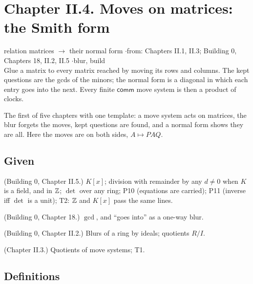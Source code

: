 \section*{Chapter II.4. Moves on matrices: the Smith form}
\begin{center}
{\normalsize relation matrices $\to$ their normal form \quad$\cdot$\quad from: Chapters II.1, II.3; Building 0, Chapters 18, II.2, II.5 \quad$\cdot$\quad blur, build}\\[4pt]
{\small Glue a matrix to every matrix reached by moving its rows and columns. The kept questions are the gcds of the minors; the normal form is a diagonal in which each entry goes into the next. Every finite $\mathsf{comm}$ move system is then a product of clocks.}
\end{center}

The first of five chapters with one template: a move system acts on matrices, the blur forgets the moves, kept questions are found, and a normal form shows they are all. Here the moves are on both sides, $A \mapsto PAQ$.

\subsection*{Given}

\begin{lines}
\item[\lab{G1}] (Building 0, Chapter II.5.) $K[x]$; division with remainder by any $d \ne 0$ when $K$ is a field, and in $\mathbb{Z}$; $\det$ over any ring; P10 (equations are carried); P11 (inverse iff $\det$ is a unit); T2: $\mathbb{Z}$ and $K[x]$ pass the same lines.
\item[\lab{G2}] (Building 0, Chapter 18.) $\gcd$, and ``goes into'' as a one-way blur.
\item[\lab{G3}] (Building 0, Chapter II.2.) Blurs of a ring by ideals; quotients $R/I$.
\item[\lab{G4}] (Chapter II.3.) Quotients of move systems; T1.
\end{lines}

\subsection*{Definitions}

